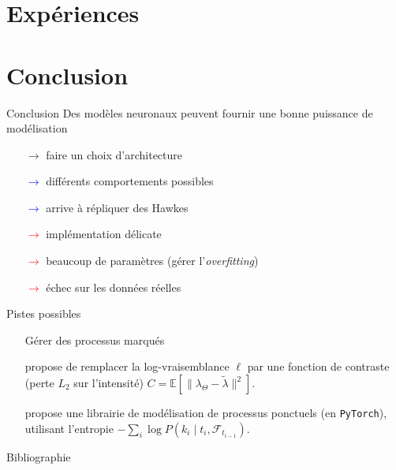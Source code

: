 \documentclass{beamer}
\newcommand{\EE}{\mathbb{E}}
\begin{document}
\section{Expériences}



\section{Conclusion}

\begin{frame}{Conclusion}
Des modèles neuronaux peuvent fournir une bonne puissance de modélisation
\begin{itemize}
	\item[$\rightarrow$] faire un choix d'architecture 
	\item[\textcolor{blue}{$\rightarrow$}] différents comportements possibles
	\item[\textcolor{blue}{$\rightarrow$}] arrive à répliquer des Hawkes\pause
	\item[\textcolor{red}{$\rightarrow$}] implémentation délicate
	\item[\textcolor{red}{$\rightarrow$}] beaucoup de paramètres (gérer l'\textit{overfitting})
	\item[\textcolor{red}{$\rightarrow$}] échec sur les données réelles
\end{itemize}
\end{frame}

\begin{frame}{Pistes possibles}

\begin{itemize}
	\item[\textbullet] Gérer des processus marqués
	\item[\textbullet] \cite[42]{2015arXiv150204592B} propose de remplacer la log-vraisemblance $\ell$ par une fonction de contraste (perte $L_2$ sur l'intensité) $C = \EE[\|\lambda_\Theta - \tilde{\lambda} \|^2]$.
	\item[\textbullet] \citeauthor{xu2018poppy} propose une librairie de modélisation de processus ponctuels (en \texttt{PyTorch}), utilisant l'entropie $-\sum_i \log P(k_i\mid t_i,\mathcal{F}_{t_{i-1}})$. \cite{xu2018poppy,xuPatientFlow2017}
\end{itemize}



\end{frame}

\begin{frame}[t,allowframebreaks]{Bibliographie}
	\printbibliography
\end{frame}
\end{document}
